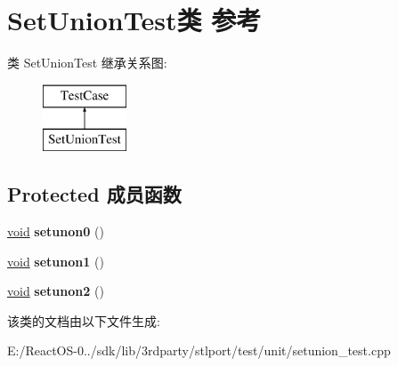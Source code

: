 \hypertarget{class_set_union_test}{}\section{Set\+Union\+Test类 参考}
\label{class_set_union_test}
类 Set\+Union\+Test 继承关系图\+:\begin{figure}[H]
\begin{center}
\leavevmode
\includegraphics[height=2.000000cm]{class_set_union_test}
\end{center}
\end{figure}
\subsection*{Protected 成员函数}
\begin{DoxyCompactItemize}
\item 
\mbox{\label{class_set_union_test_a13b05ac527bc9b3977fb390a157052a1}} 
\hyperlink{interfacevoid}{void} {\bfseries setunon0} ()
\item 
\mbox{\label{class_set_union_test_a042843068b8d2e5a9970c3a6bcd1419e}} 
\hyperlink{interfacevoid}{void} {\bfseries setunon1} ()
\item 
\mbox{\label{class_set_union_test_ab2de6e2c3b84a3b4c91d5dd34d52edeb}} 
\hyperlink{interfacevoid}{void} {\bfseries setunon2} ()
\end{DoxyCompactItemize}


该类的文档由以下文件生成\+:\begin{DoxyCompactItemize}
\item 
E\+:/\+React\+O\+S-\/0../sdk/lib/3rdparty/stlport/test/unit/setunion\+\_\+test.\+cpp\end{DoxyCompactItemize}
